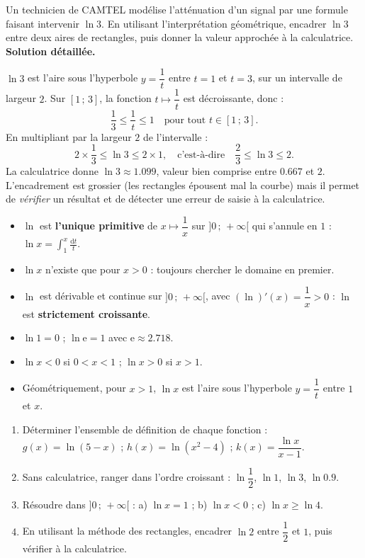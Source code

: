 \documentclass[11pt]{article}
\begin{document}
\begin{exoresolu}
Un technicien de CAMTEL modélise l'atténuation d'un signal par une formule faisant intervenir $\ln 3$. En utilisant l'interprétation géométrique, encadrer $\ln 3$ entre deux aires de rectangles, puis donner la valeur approchée à la calculatrice.
\tcblower
\textbf{Solution détaillée.}

$\ln 3$ est l'aire sous l'hyperbole $y = \dfrac{1}{t}$ entre $t = 1$ et $t = 3$, sur un intervalle de largeur $2$. Sur $[1\,;\,3]$, la fonction $t \mapsto \dfrac{1}{t}$ est décroissante, donc :
\[
\frac{1}{3} \leq \frac{1}{t} \leq 1 \quad \text{pour tout } t \in [1\,;\,3].
\]
En multipliant par la largeur $2$ de l'intervalle :
\[
2 \times \frac{1}{3} \leq \ln 3 \leq 2 \times 1,
\quad \text{c'est-à-dire} \quad
\frac{2}{3} \leq \ln 3 \leq 2.
\]
La calculatrice donne $\ln 3 \approx \num{1.099}$, valeur bien comprise entre $\num{0.667}$ et $2$. L'encadrement est grossier (les rectangles épousent mal la courbe) mais il permet de \emph{vérifier} un résultat et de détecter une erreur de saisie à la calculatrice.
\end{exoresolu}

\begin{aretenir}
\begin{itemize}
\item $\ln$ est \textbf{l'unique primitive} de $x \mapsto \dfrac{1}{x}$ sur $]0\,;\,+\infty[$ qui s'annule en $1$ : $\ln x = \displaystyle\int_1^x \frac{\mathrm{d}t}{t}$.
\item $\ln x$ n'existe que pour $x > 0$ : toujours chercher le domaine en premier.
\item $\ln$ est dérivable et continue sur $]0\,;\,+\infty[$, avec $(\ln)'(x) = \dfrac{1}{x} > 0$ : $\ln$ est \textbf{strictement croissante}.
\item $\ln 1 = 0$ ; $\ln \mathrm{e} = 1$ avec $\mathrm{e} \approx \num{2.718}$.
\item $\ln x < 0$ si $0 < x < 1$ ; $\ln x > 0$ si $x > 1$.
\item Géométriquement, pour $x > 1$, $\ln x$ est l'aire sous l'hyperbole $y = \dfrac{1}{t}$ entre $1$ et $x$.
\end{itemize}
\end{aretenir}

\begin{exercice}
\begin{enumerate}
\item Déterminer l'ensemble de définition de chaque fonction : $g(x) = \ln(5 - x)$ ; $h(x) = \ln(x^2 - 4)$ ; $k(x) = \dfrac{\ln x}{x - 1}$.
\item Sans calculatrice, ranger dans l'ordre croissant : $\ln \dfrac{1}{2}$, $\ln 1$, $\ln 3$, $\ln \num{0.9}$.
\item Résoudre dans $]0\,;\,+\infty[$ : a) $\ln x = 1$ ; b) $\ln x < 0$ ; c) $\ln x \geq \ln 4$.
\item En utilisant la méthode des rectangles, encadrer $\ln 2$ entre $\dfrac{1}{2}$ et $1$, puis vérifier à la calculatrice.
\end{enumerate}
\end{exercice}
\end{document}
